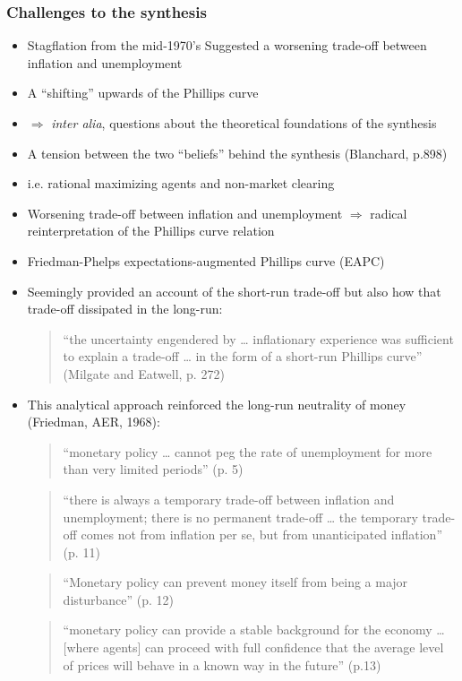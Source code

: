 \documentclass{article}
\begin{document}
\subsubsection{Challenges to the synthesis}
	\begin{itemize}
		\item Stagflation from the mid-1970's
		Suggested a worsening trade-off between inflation and unemployment
		\item A “shifting'' upwards of the Phillips curve
		\item \( \Rightarrow \) \textit{inter alia}, questions about the theoretical foundations of the synthesis
		\item A tension between the two “beliefs'' behind the synthesis (Blanchard, p.898) 
		\item i.e. rational maximizing agents and non-market clearing
		\item Worsening trade-off between inflation and unemployment \( \Rightarrow \) radical reinterpretation of the Phillips curve relation
		\item  Friedman-Phelps expectations-augmented Phillips curve (EAPC)
		\item Seemingly provided an account of the short-run trade-off but also how that trade-off dissipated in the long-run:
		\begin{quote}
			``the uncertainty engendered by … inflationary experience was sufficient to explain a trade-off … in the form of a short-run Phillips curve'' (Milgate and Eatwell, p. 272)
		\end{quote}
		\item This analytical approach reinforced the long-run neutrality of money (Friedman, AER, 1968): 
		\begin{quote}
			``monetary policy … cannot peg the rate of unemployment for more than very limited periods'' (p. 5)
		\end{quote}
		\begin{quote}
			``there is always a temporary trade-off between inflation and unemployment; there is no permanent trade-off … the temporary trade-off comes not from inflation per se, but from unanticipated  inflation'' (p. 11)
		\end{quote}
		\begin{quote}
			``Monetary policy can prevent money itself from being a major disturbance'' (p. 12)
		\end{quote}
		\begin{quote}
			``monetary policy can provide a stable background for the economy … [where agents] can proceed with full confidence that the average level of prices will behave in a known way in the future'' (p.13)

\end{quote}
\end{itemize}
\end{document}
